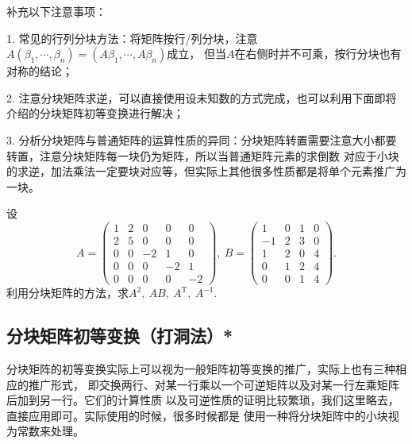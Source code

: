 补充以下注意事项：

1. 常见的行列分块方法：将矩阵按行/列分块，注意$A(\beta_1,\cdots,\beta_n)=(A\beta_1,\cdots,A\beta_n)$成立，
但当$A$在右侧时并不可乘，按行分块也有对称的结论；

2. 注意分块矩阵求逆，可以直接使用设未知数的方式完成，也可以利用下面即将介绍的分块矩阵初等变换进行解决；

3. 分析分块矩阵与普通矩阵的运算性质的异同：分块矩阵转置需要注意大小都要转置，注意分块矩阵每一块仍为矩阵，所以当普通矩阵元素的求倒数
对应于小块的求逆，加法乘法一定要块对应等，但实际上其他很多性质都是将单个元素推广为一块。
\begin{example}
	设$$A=\begin{pmatrix}
		1 & 2 & 0 & 0 & 0 \\
		2 & 5 & 0 & 0 & 0 \\
		0 & 0 & -2 & 1 & 0 \\
		0 & 0 & 0 & -2 & 1 \\
		0 & 0 & 0 & 0 & -2
	\end{pmatrix},\ B=\begin{pmatrix}
		1 & 0 & 1 & 0 \\
		-1 & 2 & 3 & 0 \\
		1 & 2 & 0 & 4 \\
		0 & 1 & 2 & 4 \\
		0 & 0 & 1 & 4
	\end{pmatrix}.$$
	利用分块矩阵的方法，求$A^2,\ AB,\ A^\mathrm{T},\ A^{-1}$.
\end{example}
\subsection{分块矩阵初等变换（打洞法）*}
分块矩阵的初等变换实际上可以视为一般矩阵初等变换的推广，实际上也有三种相应的推广形式，
即交换两行、对某一行乘以一个可逆矩阵以及对某一行左乘矩阵后加到另一行。它们的计算性质
以及可逆性质的证明比较繁琐，我们这里略去，直接应用即可。实际使用的时候，很多时候都是
使用一种将分块矩阵中的小块视为常数来处理。

